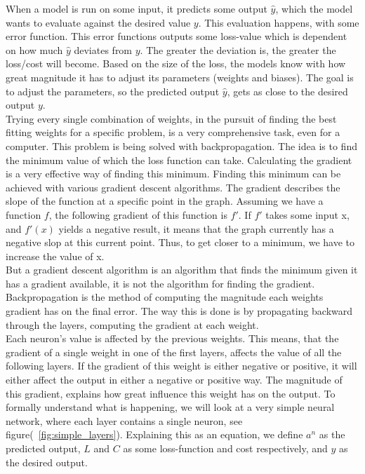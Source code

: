 When a model is run on some input, it predicts some output $\hat{y}$, which the model wants to evaluate against the desired value $y$. This evaluation happens, with some error function. This error functions outputs some loss-value which is dependent on how much $\hat{y}$ deviates from $y$. The greater the deviation is, the greater the loss/cost will become.
Based on the size of the loss, the models know with how great magnitude it has to adjust its parameters (weights and biases). The goal is to adjust the parameters, so the predicted output $\hat{y}$, gets as close to the desired output $y$.\\

\noindent
Trying every single combination of weights, in the pursuit of finding the best fitting weights for a specific problem, is a very comprehensive task, even for a computer. This problem is being solved with backpropagation. The idea is to find the minimum value of which the loss function can take. Calculating the gradient is a very effective way of finding this minimum. Finding this minimum can be achieved with various gradient descent algorithms. The gradient describes the slope of the function at a specific point in the graph. Assuming we have a function $f$, the following gradient of this function is $f'$. If $f'$ takes some input x, and $f'(x)$ yields a negative result, it means that the graph currently has a negative slop at this current point. Thus, to get closer to a minimum, we have to increase the value of x. \\

\noindent
But a gradient descent algorithm is an algorithm that finds the minimum given it has a gradient available, it is not the algorithm for finding the gradient. Backpropagation is the method of computing the magnitude each weights gradient has on the final error. The way this is done is by propagating backward through the layers, computing the gradient at each weight. \\

\noindent
Each neuron's value is affected by the previous weights. This means, that the gradient of a single weight in one of the first layers, affects the value of all the following layers. If the gradient of this weight is either negative or positive, it will either affect the output in either a negative or positive way. The magnitude of this gradient, explains how great influence this weight has on the output.
To formally understand what is happening, we will look at a very simple neural network, where each layer contains a single neuron, see figure(~\ref{fig:simple_layers}). Explaining this as an equation, we define $a^n$ as the predicted output, $L$ and $C$ as some loss-function and cost respectively, and $y$ as the desired output.

